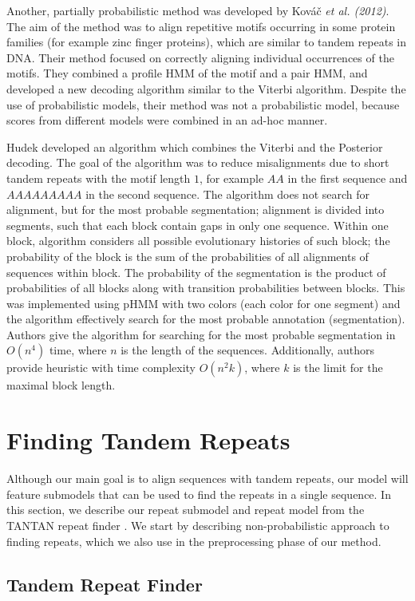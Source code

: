 Another, partially probabilistic method was developed by Kováč {\it et al.
(2012)}\nocite{Kovac2012}. The aim of the method was to align repetitive motifs
occurring in some protein families (for example zinc finger proteins), which are
similar to tandem repeats in DNA. Their method focused on correctly aligning
individual occurrences of the motifs. They combined a profile HMM of the motif
and a pair HMM, and developed a new decoding algorithm similar to the Viterbi
algorithm. Despite the use of probabilistic models, their method was not a
probabilistic model, because scores from different models were combined in an
ad-hoc manner. 

Hudek \cite{Hudek2010} developed an algorithm which combines the Viterbi and
the Posterior decoding. The goal of the algorithm was to reduce misalignments due
to short tandem repeats with the motif length $1$, for example $AA$ in the
first sequence and $AAAAAAAAA$ in the second sequence. 
The algorithm does not search for alignment, but for the most probable
segmentation; alignment is divided into segments, such that each block contain
gaps in only one sequence. Within one block, algorithm considers all possible
evolutionary histories of such block; 
the probability of the block is the sum
of the probabilities of all alignments of sequences within block. The
probability of the segmentation is the product of probabilities of all blocks
along with transition probabilities between blocks. This was implemented using
pHMM with two colors (each color for one segment) and the algorithm effectively
search for the most probable annotation (segmentation). Authors give the
algorithm for searching for the most probable segmentation in $O(n^4)$ time,
where $n$ is the length of the sequences. Additionally, authors provide
heuristic with time complexity $O(n^2k)$, where $k$ is the limit for the
maximal block length.

\section{Finding Tandem Repeats}
Although our main goal is to align sequences with tandem repeats, our model
will feature submodels that can be used to find the repeats in a single
sequence. In this section, we describe our repeat submodel and repeat model
from the TANTAN repeat finder \cite{Frith2011}. We start by describing
non-probabilistic approach to finding repeats, which we also use in the
preprocessing phase of our method.

\subsection{Tandem Repeat Finder}

